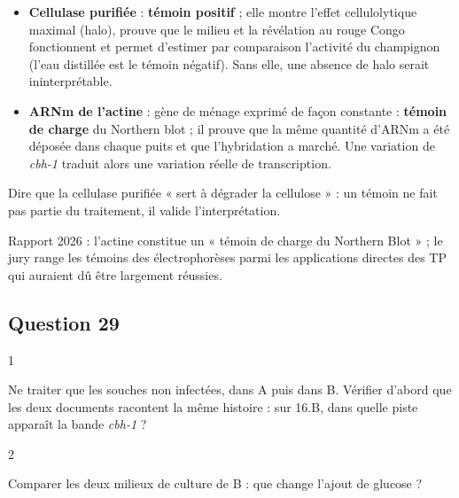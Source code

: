 \documentclass[11pt,a4paper]{article}
\providecommand{\tightlist}{\setlength{\itemsep}{0pt}\setlength{\parskip}{0pt}}
\begin{document}
\begin{itemize}
\tightlist
\item
  \textbf{Cellulase purifiée} : \textbf{témoin positif} ; elle montre l'effet cellulolytique maximal (halo), prouve que le milieu et la révélation au rouge Congo fonctionnent et permet d'estimer par comparaison l'activité du champignon (l'eau distillée est le témoin négatif). Sans elle, une absence de halo serait ininterprétable.
\item
  \textbf{ARNm de l'actine} : gène de ménage exprimé de façon constante : \textbf{témoin de charge} du Northern blot ; il prouve que la même quantité d'ARNm a été déposée dans chaque puits et que l'hybridation a marché. Une variation de \emph{cbh-1} traduit alors une variation réelle de transcription.
\end{itemize}

\begin{piege}

Dire que la cellulase purifiée « sert à dégrader la cellulose » : un témoin ne fait pas partie du traitement, il valide l'interprétation.

\end{piege}

\begin{jury}

Rapport 2026 : l'actine constitue un « témoin de charge du Northern Blot » ; le jury range les témoins des électrophorèses parmi les applications directes des TP qui auraient dû être largement réussies.

\end{jury}

\hypertarget{question-29}{%
\subsection{Question 29}\label{question-29}}

\begin{indication}{1}

Ne traiter que les souches non infectées, dans A puis dans B. Vérifier d'abord que les deux documents racontent la même histoire : sur 16.B, dans quelle piste apparaît la bande \emph{cbh-1} ?

\end{indication}

\begin{indication}{2}

Comparer les deux milieux de culture de B : que change l'ajout de glucose ?

\end{indication}
\end{document}
